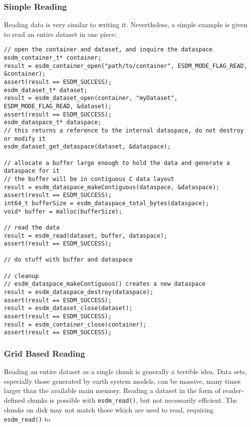 \subsubsection{Simple Reading}

Reading data is very similar to writing it. 
Nevertheless, a simple example is given to read an entire dataset in one piece:

\begin{lstlisting}
// open the container and dataset, and inquire the dataspace
esdm_container_t* container;
result = esdm_container_open("path/to/container", ESDM_MODE_FLAG_READ, &container);
assert(result == ESDM_SUCCESS);
esdm_dataset_t* dataset;
result = esdm_dataset_open(container, "myDataset", ESDM_MODE_FLAG_READ, &dataset);
assert(result == ESDM_SUCCESS);
esdm_dataspace_t* dataspace;
// this returns a reference to the internal dataspace, do not destroy or modify it
esdm_dataset_get_dataspace(dataset, &dataspace);  

// allocate a buffer large enough to hold the data and generate a dataspace for it
// the buffer will be in contiguous C data layout
result = esdm_dataspace_makeContiguous(dataspace, &dataspace);  
assert(result == ESDM_SUCCESS);
int64_t bufferSize = esdm_dataspace_total_bytes(dataspace);
void* buffer = malloc(bufferSize);

// read the data
result = esdm_read(dataset, buffer, dataspace);
assert(result == ESDM_SUCCESS);

// do stuff with buffer and dataspace

// cleanup
// esdm_dataspace_makeContiguous() creates a new dataspace
result = esdm_dataspace_destroy(dataspace); 
assert(result == ESDM_SUCCESS);
result = esdm_dataset_close(dataset);
assert(result == ESDM_SUCCESS);
result = esdm_container_close(container);
assert(result == ESDM_SUCCESS);
\end{lstlisting}

\subsubsection{Grid Based Reading}
Reading an entire dataset as a single chunk is generally a terrible idea. 
Data sets, especially those generated by earth system models, can be massive, many times larger than the available main memory. 
Reading a dataset in the form of reader-defined chunks is possible with \lstinline|esdm_read()|, but not necessarily efficient. 
The chunks on disk may not match those which are used to read, requiring \lstinline|esdm_read()| to

